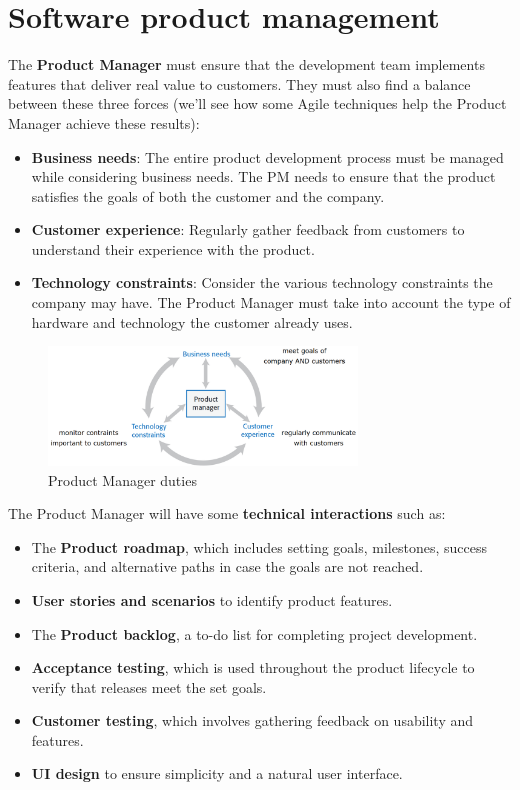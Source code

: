 \section{Software product management}

The \textbf{Product Manager} must ensure that the development team implements features that deliver real value to customers. They must also find a balance between these three forces (we'll see how some Agile techniques help the Product Manager achieve these results):

\begin{itemize}
    \item \textbf{Business needs}: The entire product development process must be managed while considering business needs. The PM needs to ensure that the product satisfies the goals of both the customer and the company.
    \item \textbf{Customer experience}: Regularly gather feedback from customers to understand their experience with the product.
    \item \textbf{Technology constraints}: Consider the various technology constraints the company may have. The Product Manager must take into account the type of hardware and technology the customer already uses.
\end{itemize}

\begin{figure} [H]
    \centering
    \includegraphics[width=0.73\textwidth]{images/Products/productmanager.png}
    \caption{Product Manager duties}
    \label{fig:productmanager}
\end{figure}

The Product Manager will have some \textbf{technical interactions} such as:
\begin{itemize}
    \item The \textbf{Product roadmap}, which includes setting goals, milestones, success criteria, and alternative paths in case the goals are not reached.
    \item \textbf{User stories and scenarios} to identify product features.
    \item The \textbf{Product backlog}, a to-do list for completing project development.
    \item \textbf{Acceptance testing}, which is used throughout the product lifecycle to verify that releases meet the set goals.
    \item \textbf{Customer testing}, which involves gathering feedback on usability and features.
    \item \textbf{UI design} to ensure simplicity and a natural user interface.
\end{itemize}


